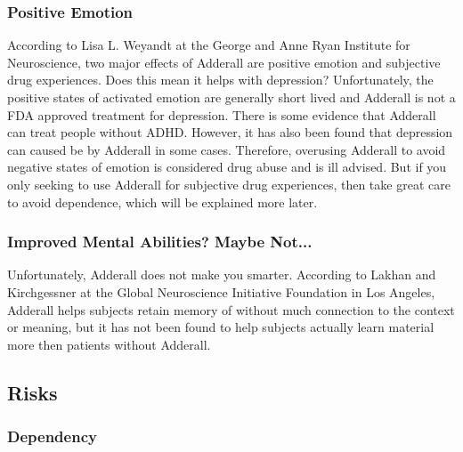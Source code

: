 \documentclass{article}
\begin{document}
            \subsubsection{Positive Emotion}
                According to Lisa L. Weyandt at the George and Anne Ryan Institute for Neuroscience\cite{weyandt18}, two major effects of Adderall are positive emotion and subjective drug experiences. Does this mean it helps with depression? Unfortunately, the positive states of activated emotion are generally short lived and Adderall is not a FDA approved treatment for depression. There is some evidence that Adderall can treat people without ADHD. However, it has also been found that depression can caused be by Adderall in some cases\cite{tardner22}. Therefore, overusing Adderall to avoid negative states of emotion is considered drug abuse and is ill advised. But if you only seeking to use Adderall for subjective drug experiences, then take great care to avoid dependence, which will be explained more later.
            \subsubsection{Improved Mental Abilities? Maybe Not...}
                 Unfortunately, Adderall does not make you smarter. According to Lakhan and Kirchgessner at the Global Neuroscience Initiative Foundation in Los Angeles\cite{lakhan12}, Adderall helps subjects retain memory of without much connection to the context or meaning, but it has not been found to help subjects actually learn material more then patients without Adderall.
                 
        \subsection{Risks}
            \subsubsection{Dependency}
\end{document}
